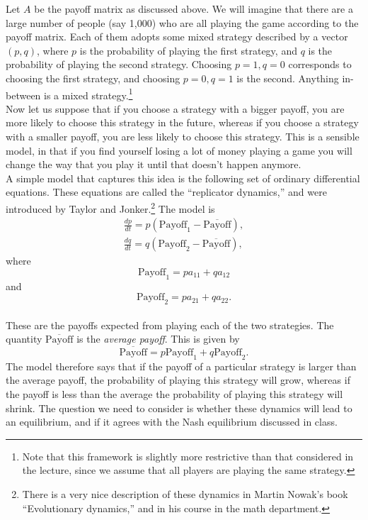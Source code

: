 \documentclass[12pt]{amsart}
\newcommand{\Pay}{\text{Payoff}}
\newcommand{\oPay}{\overline{\Pay}}
\begin{document}
\noindent Let $A$ be the payoff matrix as discussed above. We will imagine that there are
a large number of people (say 1,000) who are all playing the game according to
the payoff matrix. Each of them adopts some mixed strategy described by a
vector $(p,q)$, where $p$ is the probability of playing the first strategy, and
$q$ is the probability of playing the second strategy. Choosing $p=1,q=0$
corresponds to choosing the first strategy, and choosing $p=0,q=1$ is the
second. Anything in-between is a mixed strategy.\footnote{Note that this
framework is slightly more restrictive than that considered in the lecture,
since we assume that all players are playing the same strategy.}\\

\noindent Now let us suppose that if you choose a strategy with a bigger payoff, you are
more likely to choose this strategy in the future, whereas if you choose a
strategy with a smaller payoff, you are less likely to choose this strategy.
This is a sensible model, in that if you find yourself losing a lot of money
playing a game you will change the way that you play it until that doesn't
happen anymore.\\

\noindent A simple model that captures this idea is the following set of ordinary
differential equations. These equations are called the ``replicator dynamics,''
and were introduced by Taylor and Jonker.\footnote{There is a very nice
description of these dynamics in Martin Nowak's book ``Evolutionary dynamics,''
and in his course in the math department.} The model is
\begin{eqnarray}
  \frac{dp}{dt}= p \left( \Pay_1 - \oPay \right) \label{eq:rep1}, \\
  \frac{dq}{dt}=q\left( \Pay_2 - \oPay \right) \label{eq:rep2},
\end{eqnarray}
where $$\Pay_{1}= p a_{11} + q a_{12}$$ and $$\Pay_{2}= p a_{21}+ q a_{22}.$$\\
These are the payoffs expected from playing each of the two strategies. The
quantity $\oPay$ is the {\it average payoff}. This is given by
$$\oPay=p {\Pay}_1+q{\Pay}_2.$$ The model therefore says that if the payoff of
a particular strategy is larger than the average payoff, the probability of
playing this strategy will grow, whereas if the payoff is less than the average
the probability of playing this strategy will shrink. The question we need to
consider is whether these dynamics will lead to an equilibrium, and if it
agrees with the Nash equilibrium discussed in class.
\end{document}
